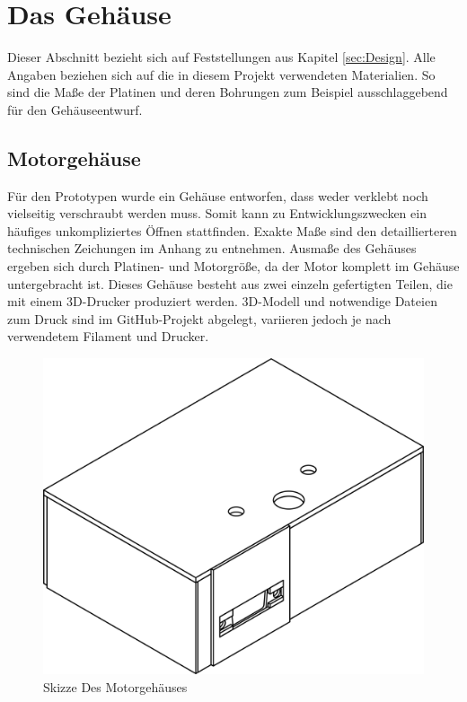 \documentclass[11pt, titlepage]{report}
\begin{document}
		\section{Das Gehäuse}
		\label{sec:Casing}
			Dieser Abschnitt bezieht sich auf Feststellungen aus Kapitel \ref{sec:Design}. Alle Angaben beziehen sich auf die in diesem Projekt verwendeten Materialien. So sind die Maße der Platinen und deren Bohrungen zum Beispiel ausschlaggebend für den Gehäuseentwurf. 
			\subsection{Motorgehäuse}
				Für den Prototypen wurde ein Gehäuse entworfen, dass weder verklebt noch vielseitig verschraubt werden muss. Somit kann zu Entwicklungszwecken ein häufiges unkompliziertes Öffnen stattfinden. Exakte Maße sind den detaillierteren technischen Zeichungen im Anhang zu entnehmen. Ausmaße des Gehäuses ergeben sich durch Platinen- und Motorgröße, da der Motor  komplett im Gehäuse untergebracht ist. Dieses Gehäuse besteht aus zwei einzeln gefertigten Teilen, die mit einem 3D-Drucker produziert werden. 3D-Modell und notwendige Dateien zum Druck sind im GitHub-Projekt abgelegt, variieren jedoch je nach verwendetem Filament und Drucker.
				\vspace{3em}
				\begin{figure}[htbp]
					\centering
					\includegraphics[width=0.75\linewidth]{./img/Motor_Case_Draw.png}
					\caption{Skizze Des Motorgehäuses
					\label{fig:imgMotorDraw}}			
				\end{figure}
			\newpage
\end{document}
